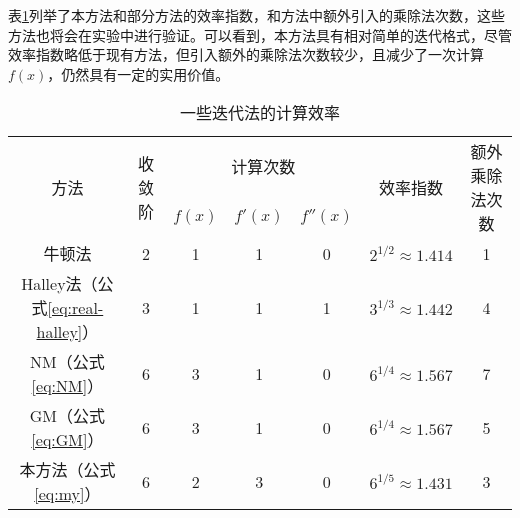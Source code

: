 表\ref{tab:compute-eff}列举了本方法和部分方法的效率指数，和方法中额外引入的乘除法次数，这些方法也将会在实验中进行验证。可以看到，本方法具有相对简单的迭代格式，尽管效率指数略低于现有方法，但引入额外的乘除法次数较少，且减少了一次计算$f(x)$，仍然具有一定的实用价值。

\begin{table}[!htbp]
    \centering
    \caption{一些迭代法的计算效率}
    \label{tab:compute-eff}
    \begin{tabular}{c|c|ccc|cc}
        \toprule
        \multirow{2}{*}{方法} & \multirow{2}{*}{收敛阶} & \multicolumn{3}{c|}{计算次数} & \multirow{2}{*}{效率指数} & \multirow{2}{*}{额外乘除法次数} \\
        \cline{3-5}
        && $f(x)$ & $f'(x)$ & $f''(x)$ & \\
        \midrule
        牛顿法 & 2 & 1 & 1 & 0 & $2^{1/2}\approx 1.414$ & 1 \\
        Halley法（公式\ref{eq:real-halley}） & 3 & 1 & 1 & 1 & $3^{1/3}\approx 1.442$ & 4 \\
        NM\cite{neta1979sixth}（公式\ref{eq:NM}） & 6 & 3 & 1 & 0 & $6^{1/4}\approx 1.567$ & 7 \\
        GM\cite{grau2006improvement}（公式\ref{eq:GM}） & 6 & 3 & 1 & 0 & $6^{1/4}\approx 1.567$ & 5 \\
        \hline
        本方法（公式\ref{eq:my}） & 6 & 2 & 3 & 0 & $6^{1/5}\approx 1.431$ & 3 \\
        \bottomrule
    \end{tabular}    
\end{table}

